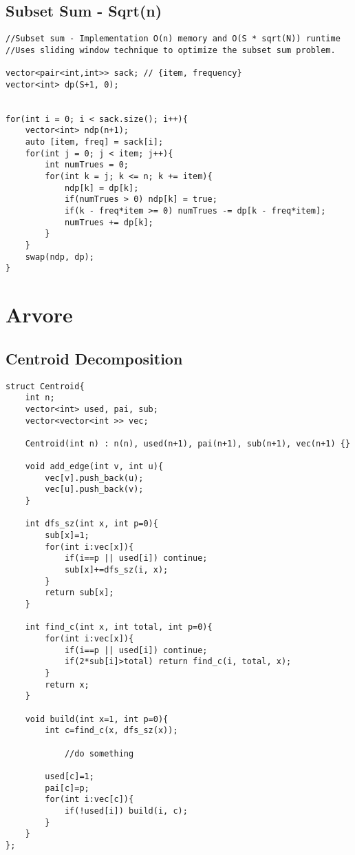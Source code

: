 \documentclass[11pt, a4paper, twoside]{article}
\begin{document}
\subsection{Subset Sum - Sqrt(n)}
\begin{verbatim}
//Subset sum - Implementation O(n) memory and O(S * sqrt(N)) runtime
//Uses sliding window technique to optimize the subset sum problem.

vector<pair<int,int>> sack; // {item, frequency}
vector<int> dp(S+1, 0);


for(int i = 0; i < sack.size(); i++){
    vector<int> ndp(n+1);
    auto [item, freq] = sack[i];
    for(int j = 0; j < item; j++){
        int numTrues = 0;
        for(int k = j; k <= n; k += item){
            ndp[k] = dp[k];
            if(numTrues > 0) ndp[k] = true;
            if(k - freq*item >= 0) numTrues -= dp[k - freq*item];
            numTrues += dp[k];
        }
    }
    swap(ndp, dp);
}
\end{verbatim}



%
%

\section{Arvore}

\subsection{Centroid Decomposition}
\begin{verbatim}
struct Centroid{
    int n;
    vector<int> used, pai, sub;
    vector<vector<int >> vec;
    
    Centroid(int n) : n(n), used(n+1), pai(n+1), sub(n+1), vec(n+1) {}
    
    void add_edge(int v, int u){
        vec[v].push_back(u);
        vec[u].push_back(v);
    }
    
    int dfs_sz(int x, int p=0){
        sub[x]=1;
        for(int i:vec[x]){
            if(i==p || used[i]) continue;
            sub[x]+=dfs_sz(i, x);
        }
        return sub[x];
    }
    
    int find_c(int x, int total, int p=0){
        for(int i:vec[x]){
            if(i==p || used[i]) continue;
            if(2*sub[i]>total) return find_c(i, total, x);
        }
        return x;
    }
        
    void build(int x=1, int p=0){
        int c=find_c(x, dfs_sz(x));
    
            //do something
            
        used[c]=1;
        pai[c]=p;
        for(int i:vec[c]){
            if(!used[i]) build(i, c);
        }
    }
};
\end{verbatim}
\end{document}
